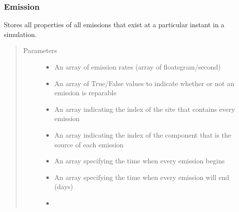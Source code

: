 \documentclass[letterpaper,10pt,english]{sphinxmanual}
\begin{document}
\subsubsection{Emission}
\label{\detokenize{index:emission}}

\begin{fulllineitems}
\label{\detokenize{index:feast.EmissionSimModules.emission_class_functions.Emission}}
Stores all properties of all emissions that exist at a particular instant in a simulation.
\begin{quote}\begin{description}
\item[{Parameters}] \leavevmode\begin{itemize}
\item {} 
 \textendash{} An array of emission rates (array of floats\textendash{}gram/second)

\item {} 
 \textendash{} An array of True/False values to indicate whether or not an emission is reparable

\item {} 
 \textendash{} An array indicating the index of the site that contains every emission

\item {} 
 \textendash{} An array indicating the index of the component that is the source of each emission

\item {} 
 \textendash{} An array specifying the time when every emission begins

\item {} 
 \textendash{} An array specifying the time when every emission will end (days)

\item {} 
 \textendash{} 


\end{itemize}
\end{description}
\end{quote}
\end{fulllineitems}
\end{document}
